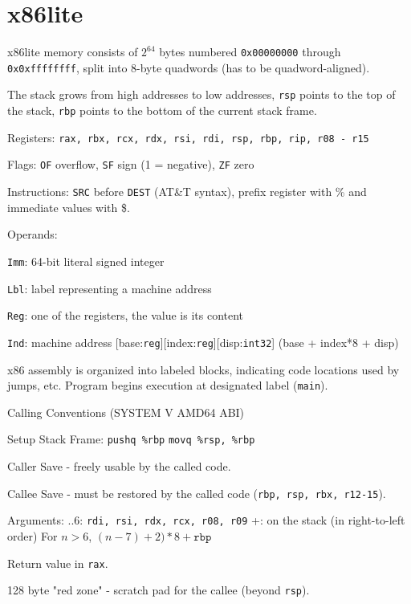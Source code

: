 \section*{x86lite}

x86lite memory consists of $2^{64}$ bytes numbered \texttt{0x00000000} through \texttt{0x0xffffffff}, split into 8-byte quadwords (has to be quadword-aligned). \medskip
	
The stack grows from high addresses to low addresses, \texttt{rsp} points to the top of the stack, \texttt{rbp} points to the bottom of the current stack frame. \medskip
	
Registers: \texttt{rax, rbx, rcx, rdx, rsi, rdi, rsp, rbp, rip, r08 - r15} \medskip
	
Flags: \texttt{OF} overflow, \texttt{SF} sign (1 = negative), \texttt{ZF} zero \medskip
	
Instructions: \texttt{SRC} before \texttt{DEST} (AT\&T syntax), prefix register with \% and immediate values with \$. \medskip
	
Operands:
\begin{compactitem}
	\item \texttt{Imm}: 64-bit literal signed integer
	\item \texttt{Lbl}: label representing a machine address
	\item \texttt{Reg}: one of the registers, the value is its content
	\item \texttt{Ind}: machine address [base:\texttt{reg}][index:\texttt{reg}][disp:\texttt{int32}] (base + index*8 + disp)
\end{compactitem} \medskip
	
x86 assembly is organized into labeled blocks, indicating code locations used by jumps, etc. Program begins execution at designated label (\texttt{main}).\medskip
	
Calling Conventions (SYSTEM V AMD64 ABI)
\begin{compactitem}
	\item Setup Stack Frame: \newline
		\texttt{pushq \%rbp} \newline 
		\texttt{movq \%rsp, \%rbp}
		
	\item Caller Save - freely usable by the called code.
	\item Callee Save - must be restored by the called code (\texttt{rbp, rsp, rbx, r12-15}).
		
	\item Arguments: ..6: \texttt{rdi, rsi, rdx, rcx, r08, r09} +: on the stack (in right-to-left order) \newline
	For $n > 6$, $(n-7) + 2) * 8 + \texttt{rbp}$
		
	\item Return value in \texttt{rax}.

	\item 128 byte "red zone" - scratch pad for the callee (beyond \texttt{rsp}).
\end{compactitem}
